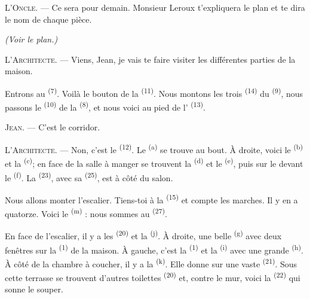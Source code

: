 \textsc{L'Oncle}. --- Ce sera pour demain. Monsieur Leroux t'expliquera le plan
et te dira le nom de chaque pièce.

\VUsaut{3.0mm}
\VUsaut{2.4mm}

{\centering\textit{(Voir le plan.)}\par}
\VUsaut{2.4mm}

\textsc{L'Architecte}. --- Viens, Jean, je vais te faire visiter les
différentes parties de la maison.

Entrons au  \textsuperscript{(7)}. Voilà le bouton de
la  \textsuperscript{(11)}. Nous montons les trois
 \textsuperscript{(14)} du 
\textsuperscript{(9)}, nous passons le  \textsuperscript{(10)} de
la  \textsuperscript{(8)}, et nous voici au pied de
l' \textsuperscript{(13)}.

\textsc{Jean}. --- C'est le corridor.

\textsc{L'Architecte}. --- Non, c'est le 
\textsuperscript{(12)}. Le  \textsuperscript{(a)} se trouve au
bout. À droite, voici le  \textsuperscript{(b)} et la
 \textsuperscript{(c)}; en face de la salle à manger se
trouvent la  \textsuperscript{(d)} et le
 \textsuperscript{(e)}, puis sur le devant le
 \textsuperscript{(f)}. La 
\textsuperscript{(23)}, avec sa  \textsuperscript{(25)},
est à côté du salon.

Nous allons monter l'escalier. Tiens-toi à la 
\textsuperscript{(15)} et compte les marches. Il y en a quatorze. Voici le
 \textsuperscript{(m)} : nous sommes au 
\textsuperscript{(27)}.

\VUsaut{3.0mm}
\VUsaut{3.0mm}

En face de l'escalier, il y a les  \textsuperscript{(20)} et
la  \textsuperscript{(j)}. À droite, une belle
 \textsuperscript{(g)} avec deux fenêtres sur la
 \textsuperscript{(1)} de la maison. À gauche, c'est la
 \textsuperscript{(1)} et la 
\textsuperscript{(i)} avec une grande  \textsuperscript{(h)}. À
côté de la chambre à coucher, il y a la 
\textsuperscript{(k)}. Elle donne sur une vaste 
\textsuperscript{(21)}. Sous cette terrasse se trouvent d'autres toilettes
\textsuperscript{(20)} et, contre le mur, voici la 
\textsuperscript{(22)} qui sonne le souper.

